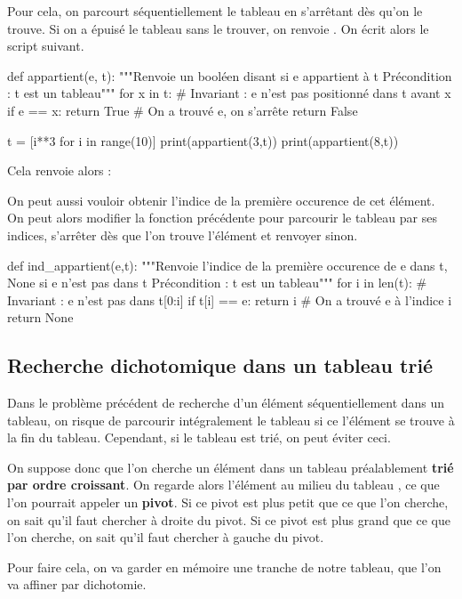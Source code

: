 Pour cela, on parcourt séquentiellement le tableau en s'arrêtant dès qu'on le trouve. Si on a épuisé 
le tableau sans le trouver, on renvoie . 
On écrit alors le script suivant.
\begin{pyverbatim}
def appartient(e, t):
    """Renvoie un booléen disant si e appartient à t
       Précondition : t est un tableau"""
    for x in t:
        # Invariant : e n'est pas positionné dans t avant x
        if e == x:
            return True # On a trouvé e, on s'arrête
    return False
 
t = [i**3 for i in range(10)]
print(appartient(3,t))
print(appartient(8,t))
\end{pyverbatim}
Cela renvoie alors :
\begin{quote}
\printpythontex[verb]
\end{quote}
On peut aussi vouloir obtenir l'indice de la première occurence de cet élément.
On peut alors modifier la fonction précédente pour parcourir le tableau par ses indices, s'arrêter 
dès que l'on trouve l'élément et renvoyer  sinon.
\begin{pyverbatim}
def ind_appartient(e,t):
    """Renvoie l'indice de la première occurence de e dans t,
       None si e n'est pas dans t
       Précondition : t est un tableau"""
    for i in len(t):
        # Invariant : e n'est pas dans t[0:i]
        if t[i] == e:
            return i # On a trouvé e à l'indice i
    return None
\end{pyverbatim}

\subsection{Recherche dichotomique dans un tableau trié}

Dans le problème précédent de recherche d'un élément séquentiellement dans un tableau, on risque de parcourir intégralement le tableau si ce l'élément se trouve à la fin du tableau. 
Cependant, si le tableau est trié, on peut éviter ceci. 

On suppose donc que l'on cherche un élément dans un tableau préalablement \textbf{trié par ordre croissant}. On regarde alors l'élément \og au milieu du tableau \fg{}, ce que l'on pourrait appeler un  \textbf{pivot}. 
Si ce pivot est plus petit que ce que l'on cherche, on sait qu'il faut chercher à droite du pivot. 
Si ce pivot est plus grand que ce que l'on cherche, on sait qu'il faut chercher à gauche du pivot. 

Pour faire cela, on va garder en mémoire une tranche de notre tableau, que l'on va affiner par dichotomie. 

